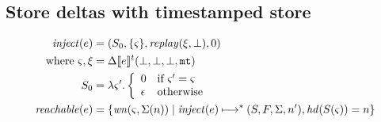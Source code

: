 \documentclass{llncs}
\newcommand{\finto}{\mathbin{\overset{\text{fin}}{\rightharpoonup}}}
\begin{document}

\subsection{Store deltas with timestamped store}

\begin{align*}
\mathit{inject}(e) &=
 (S_0, \{\varsigma\},
  \mathit{replay}(\xi,\bot), 0) \\
 \text{ where } \varsigma, \xi &= \Delta\llbracket e\rrbracket^{t}(\bot,\bot,\bot,{\tt mt}) \\
                S_0 &= \lambda\varsigma'.
                        \left\{\begin{array}{ll}
                         0 & \text{if } \varsigma' = \varsigma \\
                         \epsilon & \text{otherwise}
                        \end{array}\right. \\
\mathit{reachable}(e) &=
  \{\mathit{wn}(\varsigma,\Sigma(n)) \mid
         \mathit{inject}(e) \mathbin{\longmapsto}^* (S,F,\Sigma,n'), \mathit{hd}(S(\varsigma)) = n\}
\end{align*}
\end{document}
